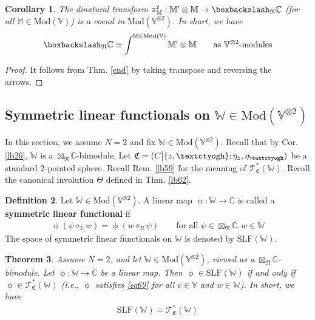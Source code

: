 \documentclass[11pt,b5paper,notitlepage]{article}
\theoremstyle{definition}
\newtheorem{df}{Definition}[section]
\theoremstyle{plain}
\newtheorem{thm}[df]{Theorem}
\newtheorem{co}[df]{Corollary}
\newcommand{\fk}{\mathfrak}
\newcommand{\SLF}{\mathrm{SLF}}
\newcommand{\Vbb}{\mathbb V}
\newcommand{\Wbb}{\mathbb W}
\newcommand{\Mbb}{\mathbb M}
\newcommand{\Cbb}{\mathbb C}
\newcommand{\<}{\left\langle}
\renewcommand{\>}{\right\rangle}
\newcommand{\ST}{\mathscr{T}}
\newcommand{\bbs}{\boxbackslash}
\newcommand{\Mod}{\mathrm{Mod}}
\newcommand{\fn}{\mathfrak{N}}
\newcommand{\tipaz}{\text{\textctyogh}}
\numberwithin{equation}{section}
\begin{document}
\begin{co}\label{coend}
	The dinatural transform $\pi_\Mbb^t:\Mbb'\otimes \Mbb\rightarrow \bbs_\fn\Cbb$ (for all $\Mbb\in \Mod(\Vbb)$) is a coend in $\Mod(\Vbb^{\otimes 2})$. In short, we have
\begin{align*}
\bbs_\fn\Cbb\simeq \int^{\Mbb\in \Mod(\Vbb)}\Mbb'\otimes \Mbb\qquad\text{as $\Vbb^{\otimes 2}$-modules}
\end{align*} 
\end{co}


\begin{proof}
It follows from Thm. \ref{end} by taking transpose and reversing the arrows.
\end{proof}







\subsection{Symmetric linear functionals on $\Wbb\in\Mod(\Vbb^{\otimes 2})$}

In this section, we assume $N=2$ and fix $\Wbb\in\Mod(\Vbb^{\otimes 2})$. Recall that by Cor. \ref{lb26}, $\Wbb$ is a $\boxtimes_\fn\Cbb$-bimodule. Let $\fk C=(C\big| \{z,\tipaz\};\eta_z,\eta_\tipaz)$ be a standard $2$-pointed sphere. Recall Rem. \ref{lb59} for the meaning of $\ST^*_{\fk C}(\Wbb)$. Recall the canonical involution $\Theta$ defined in Thm. \ref{lb62}.


\begin{df}\label{lb53}
Let $\Wbb\in\Mod(\Vbb^{\otimes 2})$. A linear map $\upphi:\Wbb\rightarrow\Cbb$ is called a \textbf{symmetric linear functional} if
\begin{align*}
\upphi(\psi\diamond_L w)=\upphi(w\diamond_R \psi)\qquad\text{for all } \psi\in \boxtimes_\fn\Cbb,w\in \Wbb
\end{align*}
The space of symmetric linear functionals on $\Wbb$ is denoted by $\pmb{\SLF(\Wbb)}$.
\end{df}

\begin{thm}\label{lb48}
Assume $N=2$, and let $\Wbb\in \Mod(\Vbb^{\otimes 2})$, viewed as a $\boxtimes_\fn\Cbb$-bimodule. Let $\upphi:\Wbb\rightarrow \Cbb$ be a linear map. Then $\upphi\in \SLF(\Wbb)$ if and only if $\upphi\in \ST_{\fk C}^*(\Wbb)$ (i.e., $\upphi$ satisfies \eqref{eq69} for all $v\in\Vbb$ and $w\in\Wbb$). In short, we have
\begin{align*}
\SLF(\Wbb)=\ST^*_{\fk C}(\Wbb)
\end{align*}
\end{thm}
\end{document}
